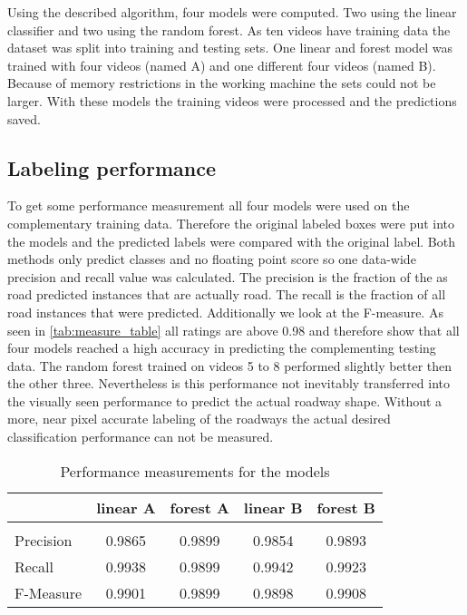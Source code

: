 Using the described algorithm, four models were computed. Two using the linear classifier and two using the random forest. As ten videos have training data the dataset was split into training and testing sets. One linear and forest model was trained with four videos (named A) and one different four videos (named B). Because of memory restrictions in the working machine the sets could not be larger. With these models the training videos were processed and the predictions saved.
\subsection{Labeling performance} %
\label{sub:labeling_precision}
To get some performance measurement all four models were used on the complementary training data. Therefore the original labeled boxes were put into the models and the predicted labels were compared with the original label. Both methods only predict classes and no floating point score so one data-wide precision and recall value was calculated. The precision is the fraction of the as road predicted instances that are actually road. The recall is the fraction of all road instances that were predicted. Additionally we look at the F-measure.
As seen in \autoref{tab:measure_table} all ratings are above 0.98 and therefore show that all four models reached a high accuracy in predicting  the complementing testing data. The random forest trained on videos 5 to 8 performed slightly better then the other three. Nevertheless is this performance not inevitably transferred into the visually seen performance to predict the actual roadway shape. Without a more, near pixel accurate labeling of the roadways the actual desired classification performance can not be measured.
\begin{table}
	\footnotesize
	\centering
	\begin{tabular}{p{1.7cm}cccc}
	& linear A & forest A & linear B & forest B \\
	\toprule \\
	Precision & 0.9865 & 0.9899 & 0.9854 & 0.9893 \\
	Recall & 0.9938 & 0.9899 & 0.9942 & 0.9923 \\
	F-Measure & 0.9901 & 0.9899 & 0.9898 & 0.9908\\
	\toprule
	\end{tabular}
	\caption{Performance measurements for the models}
	\label{tab:measure_table}
\end{table}

